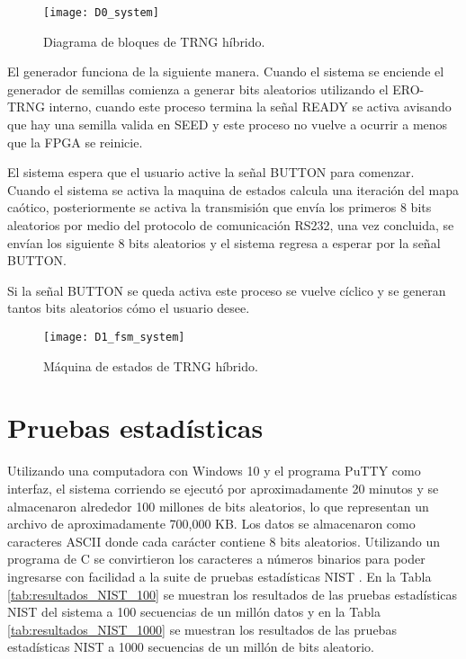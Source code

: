          \begin{figure}[hbtp]
            \caption{Diagrama de bloques de TRNG híbrido.}
            \centering
            \texttt{[image: D0\_system]}
            \label{fig:D0_system}
        \end{figure}

        El generador funciona de la siguiente manera. Cuando el sistema se enciende el generador de semillas comienza a generar bits aleatorios utilizando el ERO-TRNG interno, cuando este proceso termina la señal READY se activa avisando que hay una semilla valida en SEED y este proceso no vuelve a ocurrir a menos que la FPGA se reinicie.

       El sistema espera que el usuario active la señal BUTTON para comenzar. Cuando el sistema se activa la maquina de estados calcula una iteración del mapa caótico, posteriormente se activa la transmisión que envía los primeros 8 bits aleatorios por medio del protocolo de comunicación RS232, una vez concluida, se envían los siguiente 8 bits aleatorios y el sistema regresa a esperar por la señal BUTTON. 

       Si la señal BUTTON se queda activa este proceso se vuelve cíclico y se generan tantos bits aleatorios cómo el usuario desee.

       \begin{figure}[hbtp]
            \caption{Máquina de estados de TRNG híbrido.}
            \centering
            \texttt{[image: D1\_fsm\_system]}
            \label{fig:D1_fsm_system}
        \end{figure}

        \section{Pruebas estadísticas}

        Utilizando una computadora con Windows 10 y el programa PuTTY como interfaz, el sistema corriendo se ejecutó por aproximadamente 20 minutos y se almacenaron alrededor 100 millones de bits aleatorios, lo que representan un archivo de aproximadamente 700,000 KB. Los datos se almacenaron como caracteres ASCII donde cada carácter contiene 8 bits aleatorios. Utilizando un programa de C se convirtieron los caracteres a números binarios para poder ingresarse con facilidad a la suite de pruebas estadísticas NIST \cite{Nist2010,Turan2018}. En la Tabla \ref{tab:resultados_NIST_100} se muestran los resultados de las pruebas estadísticas NIST del sistema a 100 secuencias de un millón datos y en la Tabla \ref{tab:resultados_NIST_1000} se muestran los resultados de las pruebas estadísticas NIST a 1000 secuencias de un millón de bits aleatorio.

